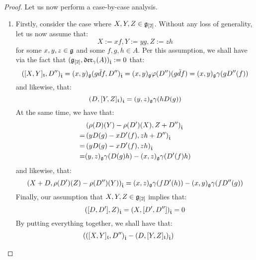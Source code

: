 \begin{proof}
                Let us now perform a case-by-case analysis.
                \begin{enumerate}
                    \item Firstly, consider the case where $X, Y, Z \in \g_{[2]}$. Without any loss of generality, let us now assume that:
                        $$X := xf, Y := yg, Z := zh$$
                    for some $x, y, z \in \g$ and some $f, g, h \in A$. Per this assumption, we shall have via the fact that $(\g_{[2]}, \divzero)_{\extendedtoroidal} := 0$ that:
                        $$( [X, Y]_{\toroidal}, D'')_{\extendedtoroidal} = (x, y)_{\g} ( g \bar{d}f, D'')_{\extendedtoroidal} = (x, y)_{\g} \varphi(D'')(g \bar{d}f) = (x, y)_{\g} \gamma( g D''(f) )$$
                    and likewise, that:
                        $$(D, [Y, Z]_{\toroidal})_{\extendedtoroidal} = (y, z)_{\g} \gamma( h D(g) )$$
                    At the same time, we have that:
                        $$
                            \begin{aligned}
                                & \left(\rho(D)(Y) - \rho(D')(X), Z + D'' \right)_{\extendedtoroidal}
                                \\
                                = & \left( y D(g) - x D'(f), zh + D'' \right)_{\extendedtoroidal}
                                \\
                                = & \left( y D(g) - x D'(f), zh \right)_{\extendedtoroidal}
                                \\
                                = & (y, z)_{\g} \gamma( D(g) h ) - (x, z)_{\g} \gamma( D'(f) h )
                            \end{aligned}
                        $$
                    and likewise, that:
                        $$\left( X + D, \rho(D')(Z) - \rho(D'')(Y) \right)_{\extendedtoroidal} = (x, z)_{\g} \gamma( f D'(h) ) - (x, y)_{\g} \gamma( f D''(g) )$$
                    Finally, our assumption that $X, Y, Z \in \g_{[2]}$ implies that:
                        $$([D, D'], Z)_{\extendedtoroidal} = (X, [D', D''])_{\extendedtoroidal} = 0$$
                    By putting everything together, we shall have that:
                        $$
                            \begin{aligned}
                                &
                                    \begin{aligned}
                                    & \left( ( [X, Y]_{\toroidal}, D'')_{\extendedtoroidal} - (D, [Y, Z]_{\toroidal})_{\extendedtoroidal} \right)

\end{aligned}
\end{aligned}$$
\end{enumerate}
\end{proof}
